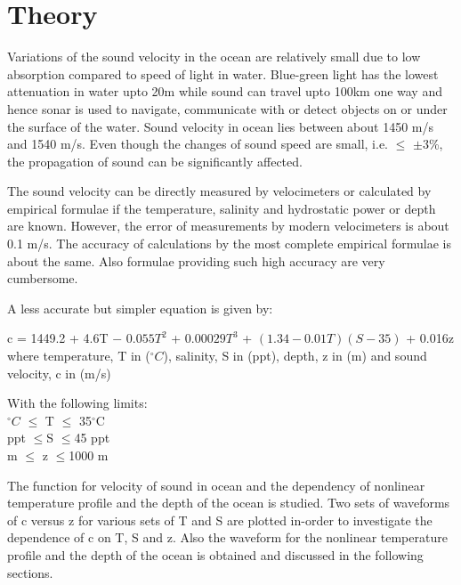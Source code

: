 \chapter{Theory} \label{Theory}

\noindent Variations of the sound velocity in the ocean are relatively small due to low absorption compared to speed of light in water. Blue-green light has the lowest attenuation in water upto 20m while sound can travel upto 100km one way and hence sonar is used to navigate, communicate with or detect objects on or under the surface of the water. Sound velocity in ocean lies between about 1450 m/s and 1540 m/s. Even though the changes of sound speed are small, i.e.  $\leq$ $\pm 3$\%, the propagation of sound can be significantly affected.

\noindent The sound velocity can be directly measured by velocimeters or calculated by empirical formulae if the temperature, salinity and hydrostatic power or depth are known. However, the error of measurements by modern velocimeters is about 0.1 m/s. The accuracy of calculations by the most complete empirical formulae is about the same. Also formulae providing such high accuracy are very cumbersome. 

\noindent A less accurate but simpler equation is given by:

c = 1449.2 + 4.6T $-$ $0.055T^2$ + $0.00029T^3$ + $(1.34 -0.01T) (S-35)$ + 0.016z \\
\noindent where temperature, T in ($^{\circ}C$), salinity, S in (ppt), depth, z in (m) and sound velocity, c in (m/s) 

\noindent With the following limits: \\
$^{\circ}C$   $\leq$ T   $\leq$ 35$^{\circ}$C  \\
 ppt   $\leq$S   $\leq$45 ppt \\
 m   $\leq$ z   $\leq$1000 m

\noindent The function for velocity of sound in ocean and the dependency of nonlinear temperature profile and the depth of the ocean is studied. Two sets of waveforms of c versus z for various sets of T and S are plotted in-order to investigate the dependence of c on T, S and z. Also the waveform for the nonlinear temperature profile and the depth of the ocean is obtained and discussed in the following sections.